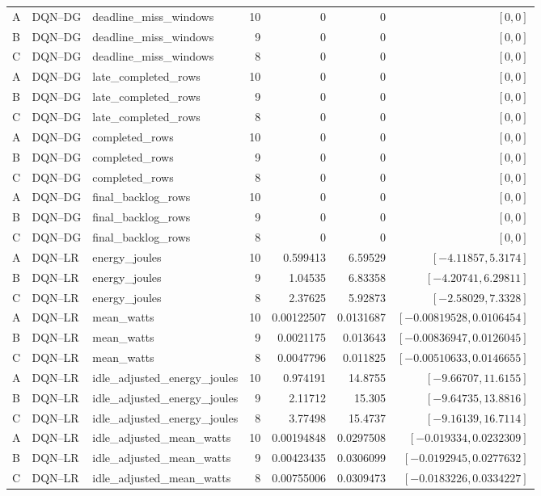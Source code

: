 \begin{longtable}{lllrrrr}
A & DQN--DG & deadline\_miss\_windows & 10 & 0 & 0 & $[0,0]$\\
B & DQN--DG & deadline\_miss\_windows & 9 & 0 & 0 & $[0,0]$\\
C & DQN--DG & deadline\_miss\_windows & 8 & 0 & 0 & $[0,0]$\\
A & DQN--DG & late\_completed\_rows & 10 & 0 & 0 & $[0,0]$\\
B & DQN--DG & late\_completed\_rows & 9 & 0 & 0 & $[0,0]$\\
C & DQN--DG & late\_completed\_rows & 8 & 0 & 0 & $[0,0]$\\
A & DQN--DG & completed\_rows & 10 & 0 & 0 & $[0,0]$\\
B & DQN--DG & completed\_rows & 9 & 0 & 0 & $[0,0]$\\
C & DQN--DG & completed\_rows & 8 & 0 & 0 & $[0,0]$\\
A & DQN--DG & final\_backlog\_rows & 10 & 0 & 0 & $[0,0]$\\
B & DQN--DG & final\_backlog\_rows & 9 & 0 & 0 & $[0,0]$\\
C & DQN--DG & final\_backlog\_rows & 8 & 0 & 0 & $[0,0]$\\
A & DQN--LR & energy\_joules & 10 & 0.599413 & 6.59529 & $[-4.11857,5.3174]$\\
B & DQN--LR & energy\_joules & 9 & 1.04535 & 6.83358 & $[-4.20741,6.29811]$\\
C & DQN--LR & energy\_joules & 8 & 2.37625 & 5.92873 & $[-2.58029,7.3328]$\\
A & DQN--LR & mean\_watts & 10 & 0.00122507 & 0.0131687 & $[-0.00819528,0.0106454]$\\
B & DQN--LR & mean\_watts & 9 & 0.0021175 & 0.013643 & $[-0.00836947,0.0126045]$\\
C & DQN--LR & mean\_watts & 8 & 0.0047796 & 0.011825 & $[-0.00510633,0.0146655]$\\
A & DQN--LR & idle\_adjusted\_energy\_joules & 10 & 0.974191 & 14.8755 & $[-9.66707,11.6155]$\\
B & DQN--LR & idle\_adjusted\_energy\_joules & 9 & 2.11712 & 15.305 & $[-9.64735,13.8816]$\\
C & DQN--LR & idle\_adjusted\_energy\_joules & 8 & 3.77498 & 15.4737 & $[-9.16139,16.7114]$\\
A & DQN--LR & idle\_adjusted\_mean\_watts & 10 & 0.00194848 & 0.0297508 & $[-0.019334,0.0232309]$\\
B & DQN--LR & idle\_adjusted\_mean\_watts & 9 & 0.00423435 & 0.0306099 & $[-0.0192945,0.0277632]$\\
C & DQN--LR & idle\_adjusted\_mean\_watts & 8 & 0.00755006 & 0.0309473 & $[-0.0183226,0.0334227]$\\

\end{longtable}
